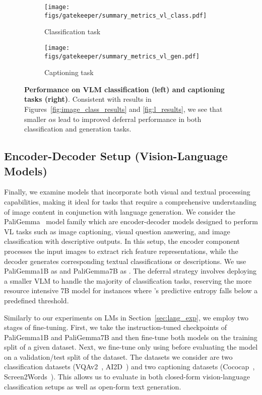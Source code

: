 
\begin{figure*}
\centering

\begin{subfigure}[b]{0.48\textwidth}
  \centering
  \texttt{[image: figs/gatekeeper/summary\_metrics\_vl\_class.pdf]}
  \caption{Classification task}
  \label{fig:vl_results_class}
\end{subfigure}
\hfill
\vrule width 0.5pt
\hfill
\begin{subfigure}[b]{0.48\textwidth}
  \centering
  \texttt{[image: figs/gatekeeper/summary\_metrics\_vl\_gen.pdf]}
  \caption{Captioning task}
  \label{fig:vl_results_gen}
\end{subfigure}

\caption[\textbf{Performance on VLM classification (left) and captioning tasks (right).}]{\textbf{Performance on VLM classification (left) and captioning tasks (right)}. Consistent with results in Figures~\ref{fig:image_class_results} and \ref{fig:l_results}, we see that smaller $\alpha$s lead to improved deferral performance in both classification and generation tasks.}
\label{fig:vl_results}
\end{figure*}

\subsection{Encoder-Decoder Setup (Vision-Language Models)}
Finally, we examine models that incorporate both visual and textual processing capabilities, making it ideal for tasks that require a comprehensive understanding of image content in conjunction with language generation. We consider the PaliGemma~\citep{steiner2024paligemma} model family which are encoder-decoder models designed to perform VL tasks such as image captioning, visual question answering, and image classification with descriptive outputs. In this setup, the encoder component processes the input images to extract rich feature representations, while the decoder generates corresponding textual classifications or descriptions. We use PaliGemma1B as \smallmodel and PaliGemma7B as \bigmodel. The deferral strategy involves deploying a smaller VLM to handle the majority of classification tasks, reserving the more resource intensive 7B model for instances where \smallmodel's predictive entropy falls below a predefined threshold.

Similarly to our experiments on LMs in Section~\ref{sec:lang_exp}, we employ two stages of fine-tuning. First, we take the instruction-tuned checkpoints of PaliGemma1B and PaliGemma7B and then fine-tune both models on the training split of a given dataset. Next, we fine-tune only \smallmodel using \loss before evaluating the model on a validation/test split of the dataset. The datasets we consider are two classification datasets (VQAv2~\citep{goyal2017making}, AI2D~\citep{hiippala2021ai2d}) and two captioning datasets (Cococap~\citep{lin2014microsoft}, Screen2Words~\citep{wang2021screen2words}). This allows us to evaluate \loss in both closed-form vision-language classification setups as well as open-form text generation.

